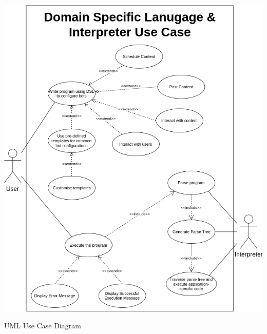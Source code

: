 \documentclass[chapterprefix=false]{scrreprt}
\begin{document}
\begin{center}
 \includegraphics[scale=0.6]{usecasedsl}
 \newline
 \caption{UML Use Case Diagram}
\end{center}

\newpage
\null
\vfill
\end{document}
